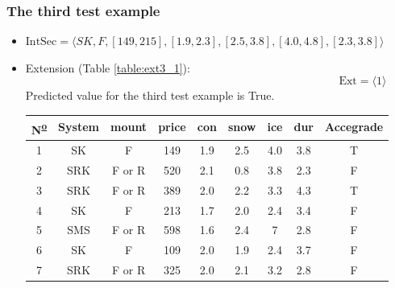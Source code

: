 \documentclass[12pt]{report}
\begin{document}
\begin{solution}
\begin{enumerate}
            \subsubsection*{The third test example}
            \begin{itemize}
              \item $\text{IntSec} = \langle SK, F, [149, 215], [1.9, 2.3], [2.5, 3.8], [4.0, 4.8], [2.3, 3.8]\rangle$
              \item Extension (Table \ref{table:ext3_1}):
              \useshortskip
              \[
                 \text{Ext} = \langle 1 \rangle
              \]
              Predicted value for the third test example is True.
              \begin{table}[H]
                \centering
                \begin{tabular}{|c|c|c|c|c|c|c|c|c|}
                \hline
                N\textsuperscript{\underline{o}} & System                      & mount  & price                       & con                         & snow                        & ice & dur & Accegrade \\ \hline
                \rowcolor[HTML]{34FF34} 
                1  & SK                          & F      & 149                         & 1.9                         & 2.5                         & 4.0 & 3.8 & T         \\ \hline
                2  & \cellcolor[HTML]{FE0000}SRK & F or R & 520                         & 2.1                         & 0.8                         & 3.8 & 2.3 & F         \\ \hline
                3  & \cellcolor[HTML]{FE0000}SRK & F or R & 389                         & 2.0                         & 2.2                         & 3.3 & 4.3 & T         \\ \hline
                4  & SK                          & F      & \cellcolor[HTML]{FFFFFF}213 & \cellcolor[HTML]{FE0000}1.7 & 2.0                         & 2.4 & 3.4 & F         \\ \hline
                5  & \cellcolor[HTML]{FE0000}SMS & F or R & 598                         & 1.6                         & 2.4                         & 7   & 2.8 & F         \\ \hline
                6  & SK                          & F      & \cellcolor[HTML]{FE0000}109 & 2.0                         & \cellcolor[HTML]{FFFFFF}1.9 & 2.4 & 3.7 & F         \\ \hline
                7  & \cellcolor[HTML]{FE0000}SRK & F or R & 325                         & 2.0                         & 2.1                         & 3.2 & 2.8 & F         \\ \hline

\end{tabular}
\end{table}
\end{itemize}
\end{enumerate}
\end{solution}
\end{document}

